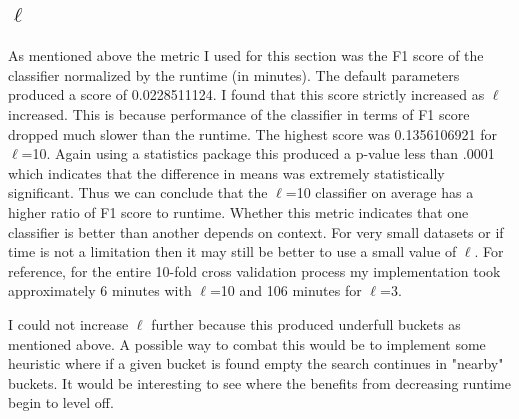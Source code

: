 \documentclass[paper=a4, fontsize=11pt]{jhwhw} %
\begin{document}
\subsection{$\ell$}
As mentioned above the metric I used for this section was the F1 score of the classifier normalized by the runtime (in minutes). The default parameters produced a score of 0.0228511124. I found that this score strictly increased as $\ell$ increased. This is because performance of the classifier in terms of F1 score dropped much slower than the runtime. The highest score was 0.1356106921 for $\ell$=10. Again using a statistics package this produced a p-value less than .0001 which indicates that the difference in means was extremely statistically significant. Thus we can conclude that the $\ell$=10 classifier on average has a higher ratio of F1 score to runtime. Whether this metric indicates that one classifier is better than another depends on context. For very small datasets or if time is not a limitation then it may still be better to use a small value of $\ell$. For reference, for the entire 10-fold cross validation process my implementation took approximately 6 minutes with $\ell$=10 and 106 minutes for $\ell$=3.

I could not increase $\ell$ further because this produced underfull buckets as mentioned above. A possible way to combat this would be to implement some heuristic where if a given bucket is found empty the search continues in "nearby" buckets. It would be interesting to see where the benefits from decreasing runtime begin to level off. 
\end{document}
